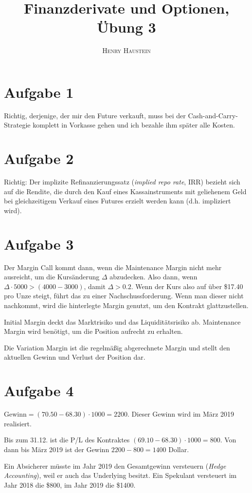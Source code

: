 \documentclass{article}
\title{\textbf{Finanzderivate und Optionen, Übung 3}}
\author{\textsc{Henry Haustein}}
\date{}
\begin{document}
	\maketitle
	
	\section*{Aufgabe 1}
	Richtig, derjenige, der mir den Future verkauft, muss bei der Cash-and-Carry-Strategie komplett in Vorkasse gehen und ich bezahle ihm später alle Kosten.

	\section*{Aufgabe 2}
	Richtig: Der implizite Refinanzierungssatz (\textit{implied repo rate}, IRR) bezieht sich auf die Rendite, die durch den Kauf eines Kassainstruments mit geliehenem Geld bei gleichzeitigem Verkauf eines Futures erzielt werden kann (d.h. impliziert wird).
	
	\section*{Aufgabe 3}
	Der Margin Call kommt dann, wenn die Maintenance Margin nicht mehr ausreicht, um die Kursänderung $\Delta$ abzudecken. Also dann, wenn $\Delta\cdot 5000 > (4000-3000)$, damit $\Delta > 0.2$. Wenn der Kurs also auf über \$17.40 pro Unze steigt, führt das zu einer Nachschussforderung. Wenn man dieser nicht nachkommt, wird die hinterlegte Margin genutzt, um den Kontrakt glattzustellen.
	
	Initial Margin deckt das Marktrisiko und das Liquiditätsrisiko ab. Maintenance Margin wird benötigt, um die Position aufrecht zu erhalten.
	
	Die Variation Margin ist die regelmäßig abgerechnete Margin und stellt den aktuellen Gewinn und Verlust der Position dar.
	
	\section*{Aufgabe 4}
	$\text{Gewinn} = (70.50 - 68.30)\cdot 1000 = 2200$. Dieser Gewinn wird im März 2019 realisiert.
	
	Bis zum 31.12. ist die P/L des Kontraktes $(69.10 - 68.30)\cdot 1000 = 800$. Von dann bis März 2019 ist der Gewinn $2200 - 800 = 1400$ Dollar.
	
	Ein Absicherer müsste im Jahr 2019 den Gesamtgewinn versteuern (\textit{Hedge Accounting}), weil er auch das Underlying besitzt. Ein Spekulant versteuert im Jahr 2018 die \$800, im Jahr 2019 die \$1400.
	
\end{document}
